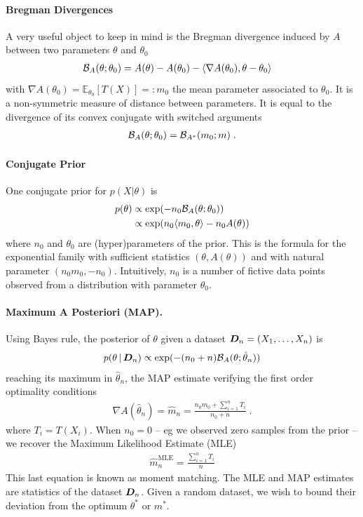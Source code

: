 \documentclass[twoside]{article}
\newcommand*{\expect}[2][]{\ensuremath{\mathbb{E}_{#1} \left[ #2 \right] }} %
\newcommand{\cond}{\,\vert\,}
\newcommand{\logpart}{A}
\newcommand{\bregman}{\cB_\logpart}
\newcommand{\bregmanconj}{\cB_{\logpart^*}}
\newcommand{\nat}{\theta}
\newcommand{\m}{m}
\newcommand{\meanp}{\m}
\newcommand{\MAPm}{\hat \m_n}
\newcommand{\MAPt}{\hat \nat_n}
\begin{document}
\paragraph{Bregman Divergences}
A very useful object to keep in mind is the Bregman divergence induced by $\logpart$ between two parameters $\nat$ and $\nat_0$
\begin{align}
    \bregman (\nat ; \nat_0)
    & = \logpart(\nat) - \logpart(\nat_0)
    - \langle \nabla \logpart(\nat_0)  , \nat - \nat_0 \rangle
\end{align}
with $\nabla \logpart(\nat_0) = \expect[\nat_0]{T(X)} =: \meanp_0$ the mean parameter associated to $\nat_0$.
It is a non-symmetric measure of distance between parameters.
It is equal to the divergence of its convex conjugate with switched arguments
\begin{align}
	\bregman (\nat ; \nat_0)
    = \bregmanconj ( \meanp_0 ; \meanp) \; .
\end{align}

\paragraph{Conjugate Prior}
One conjugate prior \citep{agarwal2010geometric} for $p(X|\nat)$ is
\begin{align}
    p(\nat)
    &\propto \exp( - n_0 \bregman(\nat ; \nat_0) ) \\
    &\propto \exp(n_0 \langle \m_0, \nat \rangle - n_0 \logpart(\nat))
\end{align}
where $n_0$ and $\nat_0$ are (hyper)parameters of the prior.
This is the formula for the exponential family with sufficient statistics $(\nat ,\logpart(\nat))$ and with natural parameter $(n_0 \m_0, -n_0)$.
Intuitively, $n_0$ is a number of fictive data points observed from a distribution with parameter $\nat_0$.

\paragraph{Maximum A Posteriori (MAP).}
Using Bayes rule, the posterior of $\nat$ given a dataset ${\bm{D}}_n =(X_1,\dots,X_n)$ is
\begin{align}
	p(\nat \cond \mD_n)
    \propto \exp(- (n_0+n) \bregman(\nat; \MAPt))
    \label{eq:joint_likelihood}
\end{align}
reaching its maximum in $\MAPt$, the MAP estimate verifying the first order optimality conditions
\begin{align}
    \nabla \logpart(\MAPt) = \MAPm
    = \frac{n_0 \meanp_0 + \sum_{i=1}^n T_i}{n_0+n} \; .
\end{align}
where $T_i=T(X_i)$.
When $n_0=0$ -- eg we observed zero samples from the prior -- we recover the Maximum Likelihood Estimate (MLE)
\begin{align}
	\hat \m_n^\text{MLE} = \frac{\sum_{i=1}^n T_i}{n}
\end{align}
This last equation is known as moment matching.
The MLE and MAP estimates are statistics of the dataset ${\bm{D}}_n$.
Given a random dataset, we wish to bound their deviation from the optimum $\nat^*$ or $\meanp^*$.
\end{document}
